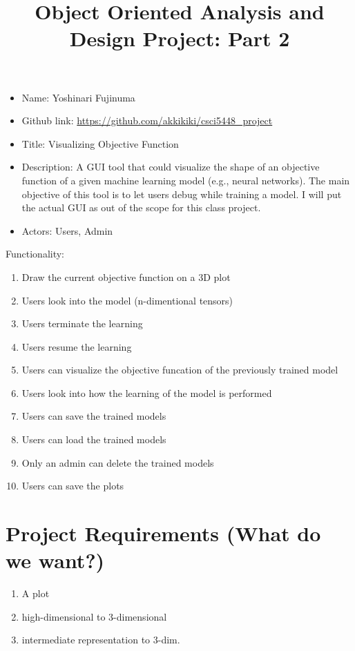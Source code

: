 \documentclass[11pt]{article}
\begin{document}
\vspace{-1cm}
\title{\vspace{-2ex} Object Oriented Analysis and Design Project: Part 2\vspace{-2ex}}
\date{\vspace{-6ex}}
\maketitle

\begin{itemize}
 \item Name: Yoshinari Fujinuma
 \item Github link: \url{https://github.com/akkikiki/csci5448_project}
 \item Title: Visualizing Objective Function
 \item Description: A GUI tool that could visualize the shape of an objective function of a given machine learning model (e.g., neural networks). The main objective of this tool is to let users debug while training a model. I will put the actual GUI as out of the scope for this class project. 
 \item Actors: Users, Admin
\end{itemize}

Functionality:
\begin{enumerate}[leftmargin=4\parindent]
 \item Draw the current objective function on a 3D plot
 \item Users look into the model (n-dimentional tensors)
 \item Users terminate the learning
 \item Users resume the learning
 \item Users can visualize the objective funcation of the previously trained model
 \item Users look into how the learning of the model is performed
 \item Users can save the trained models
 \item Users can load the trained models
 \item Only an admin can delete the trained models
 \item Users can save the plots
\end{enumerate}

\section{Project Requirements (What do we want?)}
\begin{enumerate}[leftmargin=4\parindent]
 \item A plot
 \item high-dimensional to 3-dimensional
 \item intermediate representation to 3-dim.
\end{enumerate}
\end{document}
